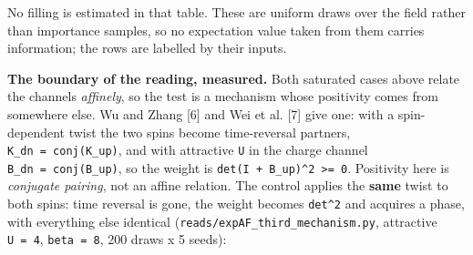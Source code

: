 \documentclass[10pt,letterpaper,twocolumn]{article}
\begin{document}
No filling is estimated in that table. These are uniform draws over the field rather than
importance samples, so no expectation value taken from them carries information; the rows are
labelled by their inputs.

\textbf{The boundary of the reading, measured.} Both saturated cases above relate the channels
\emph{affinely}, so the test is a mechanism whose positivity comes from somewhere else. Wu and Zhang {[}6{]}
and
Wei et al. {[}7{]} give one: with a spin-dependent twist the two spins become time-reversal partners,
\texttt{K\_\allowbreak{}dn\ =\allowbreak{}\ conj(\allowbreak{}K\_\allowbreak{}up)\allowbreak{}}, and with attractive \texttt{U} in the charge channel \texttt{B\_\allowbreak{}dn\ =\allowbreak{}\ conj(\allowbreak{}B\_\allowbreak{}up)\allowbreak{}}, so the
weight is \texttt{\textbar{}\allowbreak{}det(\allowbreak{}I\ +\allowbreak{}\ B\_\allowbreak{}up)\allowbreak{}\textbar{}\allowbreak{}\^{}2\ \textgreater{}\allowbreak{}=\allowbreak{}\ 0}. Positivity here is \emph{conjugate pairing}, not an affine relation.
The control applies the \textbf{same} twist to both spins: time reversal is gone, the weight becomes
\texttt{det\^{}2} and acquires a phase, with everything else identical
(\texttt{reads/\allowbreak{}expAF\_\allowbreak{}third\_\allowbreak{}mechanism.\allowbreak{}py}, attractive \texttt{\textbar{}\allowbreak{}U\textbar{}\allowbreak{}\ =\allowbreak{}\ 4}, \texttt{beta\ =\allowbreak{}\ 8}, 200 draws x 5 seeds):
\end{document}
